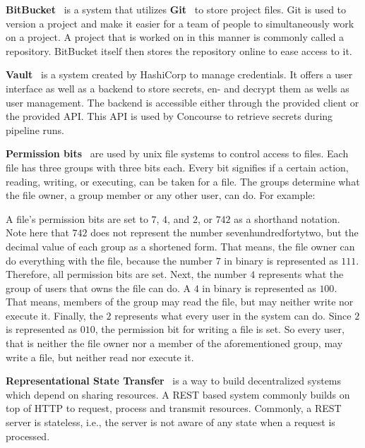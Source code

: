 \pagebreak

\textbf{BitBucket}~\cite{bitbucket} is a system that utilizes \textbf{Git}~\cite{git} to store project files.
Git is used to version a project and make it easier for a team of people to simultaneously work on a project.
A project that is worked on in this manner is commonly called a repository.
BitBucket itself then stores the repository online to ease access to it.

\textbf{Vault}~\cite{vault} is a system created by HashiCorp to manage credentials.
It offers a user interface as well as a backend to store secrets, en- and decrypt them as wells as user management.
The backend is accessible either through the provided client or the provided API.
This API is used by Concourse to retrieve secrets during pipeline runs.

\textbf{Permission bits}~\cite{unix-file-permissions} are used by unix file systems to control access to files.
Each file has three groups with three bits each.
Every bit signifies if a certain action, reading, writing, or executing, can be taken for a file.
The groups determine what the file owner, a group member or any other user, can do.
For example:

A file's permission bits are set to $7$, $4$, and $2$, or $742$ as a shorthand notation.
Note here that $742$ does not represent the number sevenhundredfortytwo, but the decimal value of each group as a shortened form.
That means, the file owner can do everything with the file, because the number $7$ in binary is represented as $111$.
Therefore, all permission bits are set.
Next, the number $4$ represents what the group of users that owns the file can do.
A $4$ in binary is represented as $100$.
That means, members of the group may read the file, but may neither write nor execute it.
Finally, the $2$ represents what every user in the system can do.
Since $2$ is represented as $010$, the permission bit for writing a file is set.
So every user, that is neither the file owner nor a member of the aforementioned group, may write a file, but neither read nor execute it.

\textbf{Representational State Transfer}~\cite{extending-representation-state-transfer} is a way to build decentralized systems which depend on sharing resources.
A REST based system commonly builds on top of HTTP to request, process and transmit resources.
Commonly, a REST server is stateless, i.e., the server is not aware of any state when a request is processed.

